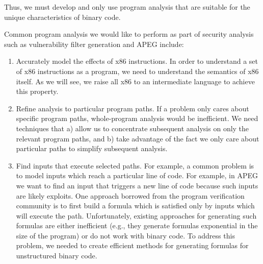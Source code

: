 Thus, we must develop and only use program analysis that are suitable
for the unique characteristics of binary code.



Common program analysis we would like to
perform as part of security analysis such as vulnerability filter
generation and APEG include:
\begin{enumerate}\squish

\item Accurately model the effects of x86 instructions.  In order to
  understand a set of x86 instructions as a program, we need to
  understand the semantics of x86 itself.  As we will see, we raise
  all x86 to an intermediate language to achieve this property.


\item Refine analysis to particular program paths. If a problem only
  cares about specific program paths, whole-program analysis would be
  inefficient. We need techniques that a) allow us to concentrate
  subsequent analysis on only the relevant program paths, and b)
  take advantage of the fact we only care about particular paths to
  simplify subsequent analysis. 

\item Find inputs that execute selected paths. For example, a common
  problem is to model inputs which reach a particular line of
  code. For example, in APEG we want to find an input that triggers a
  new line of code because such inputs are likely exploits.  One
  approach borrowed from the program verification community is to
  first build a formula which is satisfied only by inputs which will
  execute the path. Unfortunately, existing
  approaches for generating such formulas are either inefficient
  (e.g., they generate formulas exponential in the size of the
  program) or do not work with binary code. To address this problem,
  we needed to create efficient methods for generating formulas for
  unstructured binary code.


\end{enumerate}
